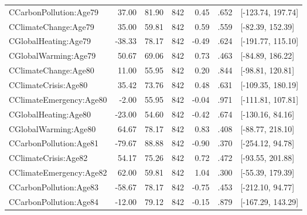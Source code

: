 \begin{table}[ht]
\begin{tabular}{lrrrrrl}
  CCarbonPollution:Age79 & 37.00 & 81.90 & 842 & 0.45 & .652 & [-123.74, 197.74] \\ 
  CClimateChange:Age79 & 35.00 & 59.81 & 842 & 0.59 & .559 & [-82.39, 152.39] \\ 
  CGlobalHeating:Age79 & -38.33 & 78.17 & 842 & -0.49 & .624 & [-191.77, 115.10] \\ 
  CGlobalWarming:Age79 & 50.67 & 69.06 & 842 & 0.73 & .463 & [-84.89, 186.22] \\ 
  CClimateChange:Age80 & 11.00 & 55.95 & 842 & 0.20 & .844 & [-98.81, 120.81] \\ 
  CClimateCrisis:Age80 & 35.42 & 73.76 & 842 & 0.48 & .631 & [-109.35, 180.19] \\ 
  CClimateEmergency:Age80 & -2.00 & 55.95 & 842 & -0.04 & .971 & [-111.81, 107.81] \\ 
  CGlobalHeating:Age80 & -23.00 & 54.60 & 842 & -0.42 & .674 & [-130.16, 84.16] \\ 
  CGlobalWarming:Age80 & 64.67 & 78.17 & 842 & 0.83 & .408 & [-88.77, 218.10] \\ 
  CCarbonPollution:Age81 & -79.67 & 88.88 & 842 & -0.90 & .370 & [-254.12, 94.78] \\ 
  CClimateCrisis:Age82 & 54.17 & 75.26 & 842 & 0.72 & .472 & [-93.55, 201.88] \\ 
  CClimateEmergency:Age82 & 62.00 & 59.81 & 842 & 1.04 & .300 & [-55.39, 179.39] \\ 
  CCarbonPollution:Age83 & -58.67 & 78.17 & 842 & -0.75 & .453 & [-212.10, 94.77] \\ 
  CCarbonPollution:Age84 & -12.00 & 79.12 & 842 & -0.15 & .879 & [-167.29, 143.29] \\ 
   \hline
\end{tabular}
\end{table}
